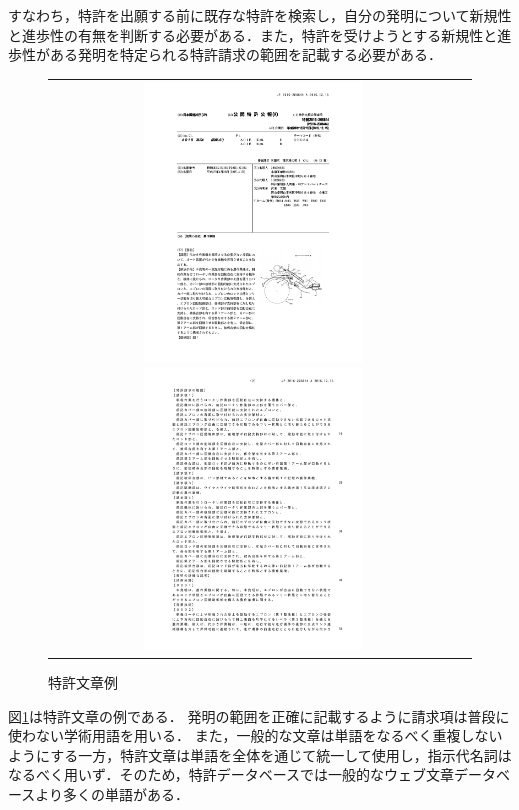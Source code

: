 \documentclass[master]{suribt}
\theoremstyle{definition}
\begin{document}
 すなわち，特許を出願する前に既存な特許を検索し，自分の発明について新規性と進歩性の有無を判断する必要がある．また，特許を受けようとする新規性と進歩性がある発明を特定られる特許請求の範囲を記載する必要がある．
 \begin{figure}
  \hspace*{-2cm}
  \begin{tabular}{cc}
  \includegraphics[width=0.55\textwidth,natwidth=500,natheight=1100]{ex1-1.pdf}
  \includegraphics[width=0.55\textwidth,natwidth=500,natheight=1100]{ex1-2.pdf}
  \end{tabular}
  \caption{特許文章例}
  \label{fig:exp}
 \end{figure}

 図\ref{fig:exp}は特許文章の例である．
 発明の範囲を正確に記載するように請求項は普段に使わない学術用語を用いる． また，一般的な文章は単語をなるべく重複しないようにする一方，特許文章は単語を全体を通じて統一して使用し，指示代名詞はなるべく用いず．そのため，特許データベースでは一般的なウェブ文章データベースより多くの単語がある．
 
\end{document}
